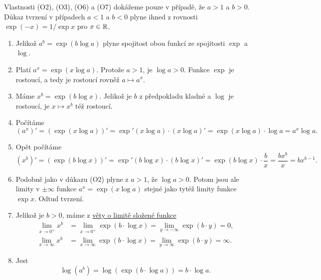 \begin{propproof}
 Vlastnosti (O2), (O3), (O6) a (O7) dokážeme pouze v případě, že $a > 1$ a $b >
 0$. Důkaz tvrzení v případech $a < 1$ a $b < 0$ plyne ihned z rovnosti
 $\exp(-x) = 1 / \exp x$ pro $x \in \mathbb{R}$.
  
 \begin{enumerate}[label=(O\arabic*)]
  \item Jelikož $a^{b} = \exp(b \log a)$ plyne spojitost obou funkcí ze
   spojitosti $\exp$ a $\log$.
  \item Platí $a^{x} = \exp(x \log a)$. Protože $a > 1$, je $\log a > 0$. Funkce
   $\exp$ je rostoucí, a tedy je rostoucí rovněž $a \mapsto a^{x}$.
  \item Máme $x^{b} = \exp(b \log x)$. Jelikož je $b$ z předpokladu kladné a
   $\log$ je rostoucí, je $x \mapsto x^{b}$ též rostoucí.
  \item Počítáme
   \[
    (a^{x})' = (\exp(x \log a))' = \exp'(x \log a) \cdot (x \log a)' = \exp(x
    \log a) \cdot \log a = a^{x} \log a.
   \]
  \item Opět počítáme
   \[
    (x^{b})' = (\exp(b\log x))' = \exp'(b \log x) \cdot (b\log x)' = \exp(b \log
    x) \cdot \frac{b}{x} = \frac{bx^{b}}{x} = bx^{b-1}.
   \]
  \item Podobně jako v důkazu (O2) plyne z $a > 1$, že $\log a > 0$. Potom jsou
   ale limity v $ \pm \infty$ funkce $a^{x} = \exp(x \log a)$ stejné jako tytéž
   limity funkce $\exp x$. Odtud tvrzení.
  \item Jelikož je $b > 0$, máme z \hyperref[thm:limita-slozene-funkce]{věty o
   limitě složené funkce} 
   \begin{align*}
    \lim_{x \to 0^{+}} x^{b} &= \lim_{x \to 0^{+}} \exp(b \cdot \log x) =
    \lim_{y \to -\infty} \exp(b \cdot y) = 0,\\
     \lim_{x \to \infty} x^{b} &= \lim_{x \to \infty} \exp(b \cdot \log x) =
     \lim_{y \to \infty} \exp(b \cdot y) = \infty.
   \end{align*}
  \item Jest
   \[
    \log(a^{b}) = \log(\exp(b \cdot \log a)) = b \cdot \log a.
   \]
 \end{enumerate}
\end{propproof}

